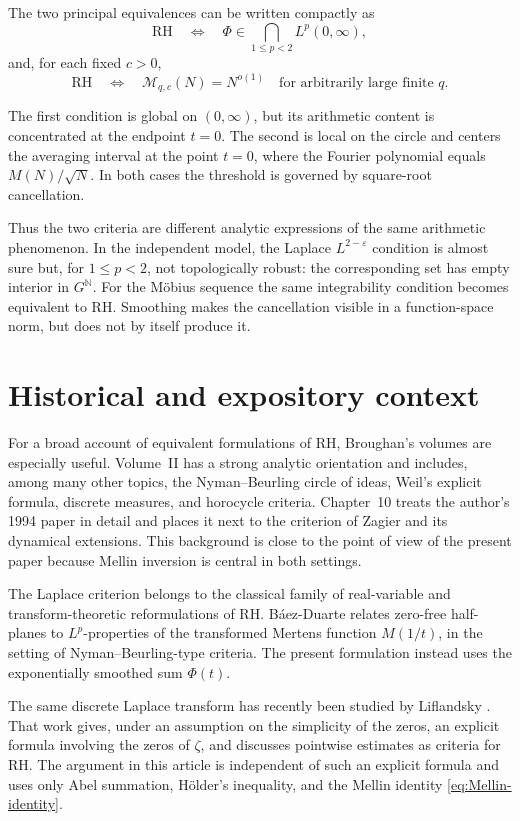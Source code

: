 \documentclass[11pt]{article}
\theoremstyle{remark}
\newcommand{\Mcal}{\mathcal M}
\begin{document}
The two principal equivalences can be written compactly as
\[
\mathrm{RH}
\quad\Longleftrightarrow\quad
\Phi\in\bigcap_{1\le p<2}L^p(0,\infty),
\]
and, for each fixed \(c>0\),
\[
\mathrm{RH}
\quad\Longleftrightarrow\quad
\Mcal_{q,c}(N)=N^{o(1)}
\quad\text{for arbitrarily large finite }q.
\]

The first condition is global on \((0,\infty)\), but its arithmetic
content is concentrated at the endpoint \(t=0\).  The second is local
on the circle and centers the averaging interval at the point
\(t=0\), where the Fourier polynomial equals \(M(N)/\sqrt N\).
In both cases the threshold is governed by square-root cancellation.

Thus the two criteria are different analytic expressions of the same
arithmetic phenomenon.  In the independent model, the Laplace
\(L^{2-\varepsilon}\) condition is almost sure but, for
\(1\le p<2\), not topologically robust: the corresponding set has
empty interior in \(G^{\mathbb N}\).  For the M\"obius sequence the
same integrability condition becomes equivalent to RH.  Smoothing makes the cancellation
visible in a function-space norm, but does not by itself produce it.

\section{Historical and expository context}

For a broad account of equivalent formulations of RH, Broughan's
volumes \cite{BroughanI,BroughanII,BroughanIII} are especially useful.
Volume~II has a strong analytic orientation and includes, among many
other topics, the Nyman--Beurling circle of ideas, Weil's explicit
formula, discrete measures, and horocycle criteria.  Chapter~10 treats
the author's 1994 paper \cite{VerjovskyDiscrete} in detail and places
it next to the criterion of Zagier and its dynamical extensions.  This
background is close to the point of view of the present paper because
Mellin inversion is central in both settings.

The Laplace criterion belongs to the classical family of real-variable
and transform-theoretic reformulations of RH.  B\'aez-Duarte
\cite{BaezDuarte} relates zero-free half-planes to \(L^p\)-properties
of the transformed Mertens function \(M(1/t)\), in the setting of
Nyman--Beurling-type criteria.  The present formulation instead uses
the exponentially smoothed sum \(\Phi(t)\).

The same discrete Laplace transform has recently been studied by
Liflandsky \cite{Liflandsky}.  That work gives, under an assumption on
the simplicity of the zeros, an explicit formula involving the zeros
of \(\zeta\), and discusses pointwise estimates as criteria for RH.
The argument in this article is independent of such an explicit
formula and uses only Abel summation, H\"older's inequality, and the
Mellin identity \eqref{eq:Mellin-identity}.
\end{document}
